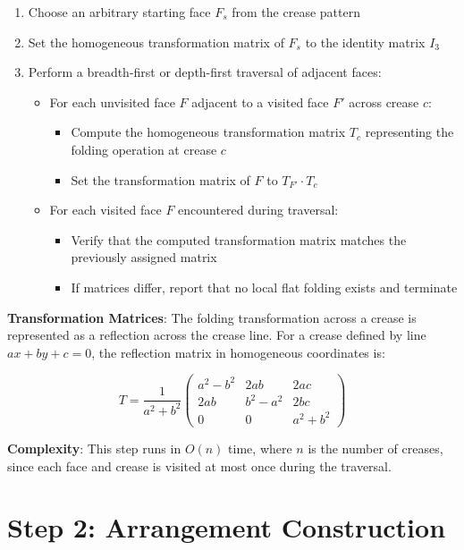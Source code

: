 \begin{enumerate}
\item Choose an arbitrary starting face $F_s$ from the crease pattern
\item Set the homogeneous transformation matrix of $F_s$ to the identity matrix $I_3$
\item Perform a breadth-first or depth-first traversal of adjacent faces:
\begin{itemize}
\item For each unvisited face $F$ adjacent to a visited face $F'$ across crease $c$:
\begin{itemize}
\item Compute the homogeneous transformation matrix $T_c$ representing the folding operation at crease $c$
\item Set the transformation matrix of $F$ to $T_{F'} \cdot T_c$
\end{itemize}
\item For each visited face $F$ encountered during traversal:
\begin{itemize}
\item Verify that the computed transformation matrix matches the previously assigned matrix
\item If matrices differ, report that no local flat folding exists and terminate
\end{itemize}
\end{itemize}
\end{enumerate}

\textbf{Transformation Matrices}: The folding transformation across a crease is represented as a reflection across the crease line. For a crease defined by line $ax + by + c = 0$, the reflection matrix in homogeneous coordinates is:

$$
T = \frac{1}{a^2 + b^2} \begin{pmatrix}
a^2 - b^2 & 2ab & 2ac \\
2ab & b^2 - a^2 & 2bc \\
0 & 0 & a^2 + b^2
\end{pmatrix}
$$

\textbf{Complexity}: This step runs in $O(n)$ time, where $n$ is the number of creases, since each face and crease is visited at most once during the traversal.

\section{Step 2: Arrangement Construction}

